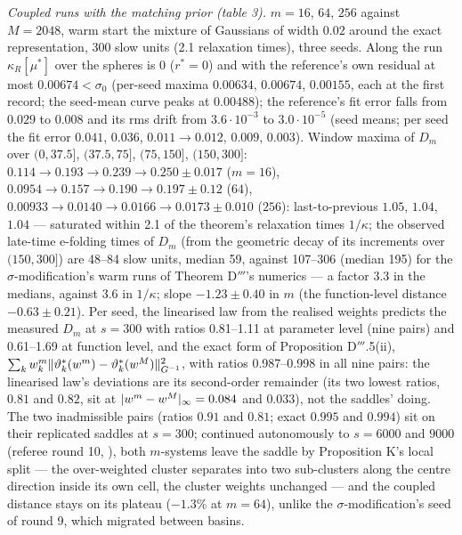 \smallskip
\noindent\emph{Coupled runs with the matching prior (table 3).} $m = 16$, $64$, $256$ against $M = 2048$, warm
start the mixture of Gaussians of width $0.02$ around the exact representation, 300 slow units (2.1 relaxation
times), three seeds. Along the run $\kappa_R[\mu^*]$ over the spheres is $0$ ($r^* = 0$) and with the reference's
own residual at most $0.00674 < \sigma_0$ (per-seed maxima $0.00634$, $0.00674$, $0.00155$, each at the first
record; the seed-mean curve peaks at $0.00488$); the reference's fit error falls from $0.029$ to $0.008$ and its
rms drift from $3.6\cdot10^{-3}$ to $3.0\cdot10^{-5}$ (seed means; per seed the fit error $0.041$, $0.036$,
$0.011\to0.012$, $0.009$, $0.003$). Window maxima of $D_m$ over $(0,37.5]$, $(37.5,75]$, $(75,150]$, $(150,300]$:
$0.114\to0.193\to0.239\to0.250\pm0.017$ ($m = 16$), $0.0954\to0.157\to0.190\to0.197\pm0.12$ ($64$),
$0.00933\to0.0140\to0.0166\to0.0173\pm0.010$ ($256$): last-to-previous $1.05$, $1.04$, $1.04$ --- saturated within
2.1 of the theorem's relaxation times $1/\kappa$; the observed late-time e-folding times of $D_m$ (from the
geometric decay of its increments over $(150,300]$) are 48--84 slow units, median 59, against 107--306 (median 195)
for the $\sigma$-modification's warm runs of Theorem D$'''$'s numerics --- a factor 3.3 in the medians, against 3.6
in $1/\kappa$; slope $-1.23\pm0.40$ in $m$ (the function-level distance $-0.63\pm0.21$). Per seed, the linearised
law from the realised weights predicts the measured $D_m$ at $s = 300$ with ratios 0.81--1.11 at parameter level
(nine pairs) and 0.61--1.69 at function level, and the exact form of Proposition D$'''$.5(ii),
$\sum_kw^m_k\lVert \vartheta^*_k(w^m) - \vartheta^*_k(w^M)\rVert^2_{G^{-1}}$, with ratios 0.987--0.998 in all nine pairs:
the linearised law's deviations are its second-order remainder (its two lowest ratios, $0.81$ and $0.82$, sit at
$\lvert w^m - w^M\rvert_\infty = 0.084$ and $0.033$), not the saddles' doing. The two inadmissible pairs (ratios $0.91$ and
$0.81$; exact $0.995$ and $0.994$) sit on their replicated saddles at $s = 300$; continued autonomously to
$s = 6000$ and $9000$ (referee round 10, ), both $m$-systems leave the saddle by
Proposition K's local split --- the over-weighted cluster separates into two sub-clusters along the centre direction
inside its own cell, the cluster weights unchanged --- and the coupled distance stays on its plateau ($-1.3$\% at
$m = 64$), unlike the $\sigma$-modification's seed of round 9, which migrated between basins.

